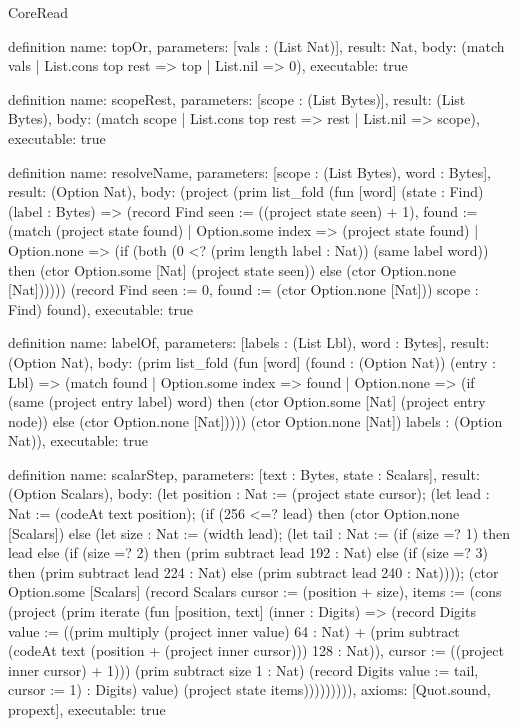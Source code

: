 \begin{lexlean}{CoreRead}
\begin{semanticmodule}
definition{
  name: topOr,
  parameters: [vals : (List Nat)],
  result: Nat,
  body: (match vals | List.cons top rest => top | List.nil => 0),
  executable: true
}

definition{
  name: scopeRest,
  parameters: [scope : (List Bytes)],
  result: (List Bytes),
  body: (match scope | List.cons top rest => rest | List.nil => scope),
  executable: true
}

definition{
  name: resolveName,
  parameters: [scope : (List Bytes), word : Bytes],
  result: (Option Nat),
  body: (project (prim list_fold (fun [word] (state : Find) (label : Bytes) => (record Find {seen := ((project state seen) + 1), found := (match (project state found)
    | Option.some index => (project state found)
    | Option.none => (if (both (0 <? (prim length label : Nat)) (same label word)) then (ctor Option.some [Nat] (project state seen)) else (ctor Option.none [Nat])))})) (record Find {seen := 0, found := (ctor Option.none [Nat])}) scope : Find) found),
  executable: true
}

definition{
  name: labelOf,
  parameters: [labels : (List Lbl), word : Bytes],
  result: (Option Nat),
  body: (prim list_fold (fun [word] (found : (Option Nat)) (entry : Lbl) => (match found
    | Option.some index => found
    | Option.none => (if (same (project entry label) word) then (ctor Option.some [Nat] (project entry node)) else (ctor Option.none [Nat])))) (ctor Option.none [Nat]) labels : (Option Nat)),
  executable: true
}

definition{
  name: scalarStep,
  parameters: [text : Bytes, state : Scalars],
  result: (Option Scalars),
  body: (let position : Nat := (project state cursor); (let lead : Nat := (codeAt text position); (if (256 <=? lead) then (ctor Option.none [Scalars]) else (let size : Nat := (width lead); (let tail : Nat := (if (size =? 1) then lead else (if (size =? 2) then (prim subtract lead 192 : Nat) else (if (size =? 3) then (prim subtract lead 224 : Nat) else (prim subtract lead 240 : Nat)))); (ctor Option.some [Scalars] (record Scalars {cursor := (position + size), items := (cons (project (prim iterate (fun [position, text] (inner : Digits) => (record Digits {value := ((prim multiply (project inner value) 64 : Nat) + (prim subtract (codeAt text (position + (project inner cursor))) 128 : Nat)), cursor := ((project inner cursor) + 1)})) (prim subtract size 1 : Nat) (record Digits {value := tail, cursor := 1}) : Digits) value) (project state items))}))))))),
  axioms: [Quot.sound, propext],
  executable: true
}


\end{semanticmodule}
\end{lexlean}
